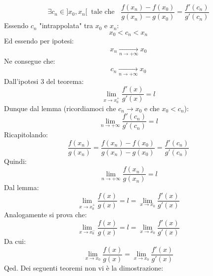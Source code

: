{	\begin{equation*}
		\exists c_n \in ]x_0, x_n[ \;\; \text{tale che } \;\; \dfrac{f(x_n) - f(x_0)}{g(x_n) - g(x_0)} = \dfrac{f'(c_n)}{g'(c_n)}
	\end{equation*}
	Essendo $c_n$ "intrappolata" tra $x_0$ e $x_n$:
	\begin{equation*}
		x_0 < c_n < x_n
	\end{equation*}
	Ed essendo per ipotesi:
	\begin{equation*}
		x_n \xrightarrow[n \to + \infty]{} x_0
	\end{equation*}
	Ne consegue che:
	\begin{equation*}
		c_n \xrightarrow[n \to + \infty]{} x_0
	\end{equation*}
	Dall'ipotesi 3 del teorema:
	\begin{equation*}
		\lim_{x \to x_0^+} \dfrac{f'(x)}{g'(x)} = l
	\end{equation*}
	Dunque dal lemma (ricordiamoci che $c_n \to x_0$ e che $x_0 < c_n$):
	\begin{equation*}
		\lim_{n \to +\infty} \dfrac{f'(c_n)}{g'(c_n)} = l
	\end{equation*}
	Ricapitolando:
	\begin{equation*}
		\dfrac{f(x_n)}{g(x_n)} = \dfrac{f(x_n) - f(x_0)}{g(x_n) - g(x_0)} = \dfrac{f'(c_n)}{g'(c_n)}
	\end{equation*}
	Quindi:
	\begin{equation*}
		\lim_{n \to + \infty} \dfrac{f(x_n)}{g(x_n)} = l
	\end{equation*}
	Dal lemma:
	\begin{equation*}
		\lim_{x \to x_0^+} \dfrac{f(x)}{g(x)} = l = \lim_{x \to x_0} \dfrac{f'(x)}{g'(x)}
	\end{equation*}
	Analogamente si prova che:
	\begin{equation*}
		\lim_{x \to x_0^-} \dfrac{f(x)}{g(x)} = l = \lim_{x \to x_0} \dfrac{f'(x)}{g'(x)}
	\end{equation*}
	Da cui:
	\begin{equation*}
		\lim_{x \to x_0} \dfrac{f(x)}{g(x)} = \lim_{x \to x_0} \dfrac{f'(x)}{g'(x)}
	\end{equation*}
	\hfill Qed.
}
Dei seguenti teoremi non vi è la dimostrazione:

